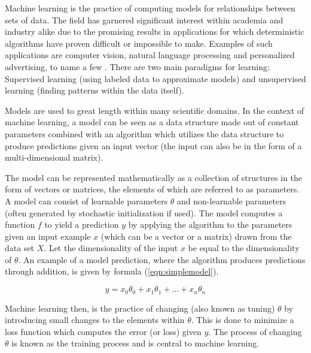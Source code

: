 Machine learning is the practice of computing models for relationships between sets of data. The field has garnered significant interest within academia and industry alike due to the promising results in applications for which deterministic algorithms have proven difficult or impossible to make. Examples of such applications are computer vision, natural language processing and personalized advertising, to name a few \cite{sebe2005machine, allen2003natural, malheiros2012too}. There are two main paradigms for learning: Supervised learning (using labeled data to approximate models) and unsupervised learning (finding patterns within the data itself). 

Models are used to great length within many scientific domains. In the context of machine learning, a model can be seen as a data structure made out of constant parameters combined with an algorithm which utilizes the data structure to produce predictions given an input vector (the input can also be in the form of a multi-dimensional matrix). 

The model can be represented mathematically as a collection of structures in the form of vectors or matrices, the elements of which are referred to as parameters. A model can consist of learnable parameters $\theta$ and non-learnable parameters (often generated by stochastic initialization if used). The model computes a function $f$ to yield a prediction $y$ by applying the algorithm to the parameters given an input example $x$ (which can be a vector or a matrix) drawn from the data set $X$. Let the dimensionality of the input $x$ be equal to the dimensionality of $\theta$. An example of a model prediction, where the algorithm produces predictions through addition, is given by formula (\ref{eqn:simplemodel}).

\begin{equation}
\label{eqn:simplemodel}
 y = x_0\theta_0 + x_1\theta_1 + ... + x_n\theta_n
\end{equation}

Machine learning then, is the practice of changing (also known as tuning) $\theta$ by introducing small changes to the elements within $\theta$. This is done to minimize a loss function which computes the error (or loss) given $y$. The process of changing $\theta$ is known as the training process and is central to machine learning. 

